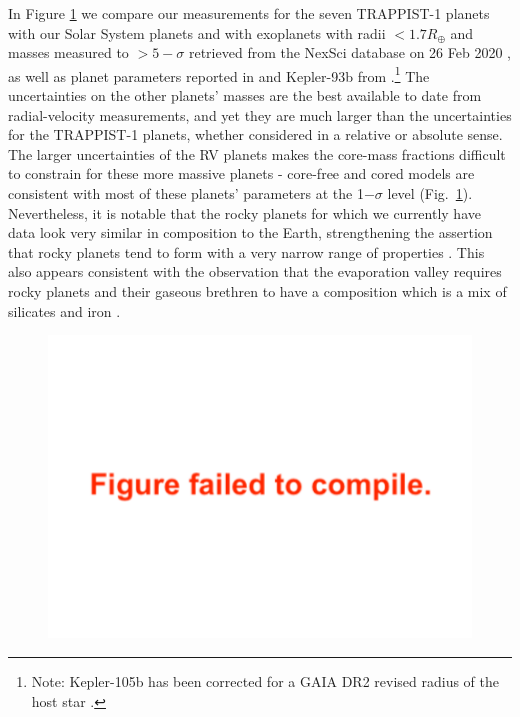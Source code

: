 \documentclass[twocolumn]{aastex63}
\begin{document}
In Figure \ref{fig:mass_radius_comparison} we compare our measurements for
the seven TRAPPIST-1 planets with our Solar System planets and with exoplanets
with radii ${<}1.7 R_\oplus$ and masses measured to ${>}5-\sigma$ retrieved from
the NexSci database on 26 Feb 2020 \citep{Akeson2013,Christiansen2018}, as well
as planet parameters reported in \citet{Dai2019} and Kepler-93b from \citet{Dressing2015}.\footnote{Note: Kepler-105b has been corrected for a GAIA DR2 revised radius of
    the host star \citep{Berger2018,Fulton2018}.}   The uncertainties
on the other planets' masses are the best available to date from radial-velocity measurements, and yet they are much larger than the uncertainties for the TRAPPIST-1 planets, whether considered in
a relative or absolute sense.  The larger uncertainties of the RV planets makes the core-mass fractions difficult to constrain
for these more massive planets - core-free and cored models are consistent with most of these planets' parameters at the 1$-\sigma$ level (Fig.\ \ref{fig:mass_radius_comparison}).   Nevertheless, it is notable that the
rocky planets for which we currently have data look very similar in composition to the
Earth, strengthening the assertion that rocky planets tend to form with a very
narrow range of properties \citep{Dressing2015}.
This also appears consistent with the observation
that the evaporation valley requires rocky planets and their gaseous brethren to have
a composition which is a mix of silicates and iron \citep{Owen2017}.

\begin{figure}
    \centering
    \includegraphics[width = \hsize]{figures/mass_radius_relation_comparison.pdf}
    \label{fig:mass_radius_comparison}
\end{figure}
\end{document}
